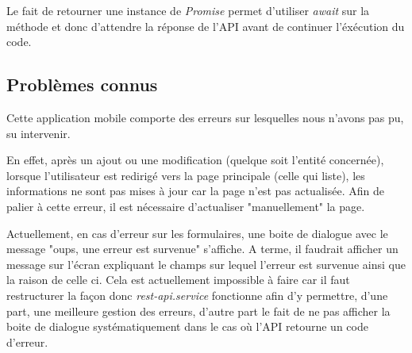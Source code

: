			\noindent
			Le fait de retourner une instance de \textit{Promise} permet d'utiliser \textit{await} sur la méthode et donc d'attendre la réponse de l'API avant de continuer l'éxécution du code.

		\subsection{Problèmes connus}

			Cette application mobile comporte des erreurs sur lesquelles nous n'avons pas pu, su intervenir.

			\noindent
			En effet, après un ajout ou une modification (quelque soit l'entité concernée), lorsque l'utilisateur est redirigé vers la page principale (celle qui liste), les informations ne sont pas mises à jour car la page n'est pas actualisée. \newline
			Afin de palier à cette erreur, il est nécessaire d'actualiser "manuellement" la page.

			\noindent
			Actuellement, en cas d'erreur sur les formulaires, une boite de dialogue avec le message "oups, une erreur est survenue" s'affiche. A terme, il faudrait afficher un message sur l'écran expliquant le champs sur lequel l'erreur est survenue ainsi que la raison de celle ci. Cela est actuellement impossible à faire car il faut restructurer la façon donc \textit{rest-api.service} fonctionne afin d'y permettre, d'une part, une meilleure gestion des erreurs, d'autre part le fait de ne pas afficher la boite de dialogue systématiquement dans le cas où l'API retourne un code d'erreur.
